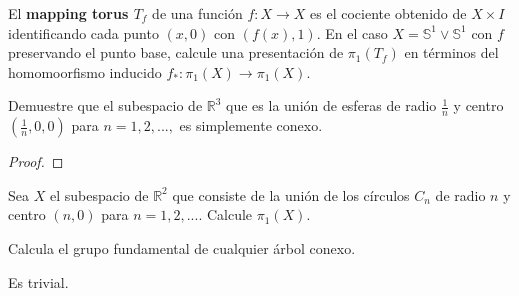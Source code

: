 \documentclass[12pt]{report}
\theoremstyle{largebreak}
\newcommand\cf[3]{\ensuremath{#1:#2\rightarrow#3}}
\begin{document}
    \begin{excer}
        El \textbf{mapping torus $T_f$} de una función $\cf{f}{X}{X}$ es el cociente obtenido de $X\times I$ identificando cada punto $(x,0)$ con $(f(x),1)$. En el caso $X=\mathbb{S}^1\lor\mathbb{S}^1$ con $f$ preservando el punto base, calcule una presentación de $\pi_1(T_f)$ en términos del homomoorfismo inducido $\cf{f_*}{\pi_1(X)}{\pi_1(X)}$.
    \end{excer}

    \begin{sol}
        
    \end{sol}

    \begin{excer}
        Demuestre que el subespacio de $\mathbb{R}^3$ que es la unión de esferas de radio $\frac{1}{n}$ y centro $\left(\frac{1}{n},0,0\right)$ para $n=1,2,...,$ es simplemente conexo.
    \end{excer}

    \begin{proof}
        
    \end{proof}

    \begin{excer}
        Sea $X$ el subespacio de $\mathbb{R}^2$ que consiste de la unión de los círculos $C_n$ de radio $n$ y centro $(n,0)$ para $n=1,2,...$. Calcule $\pi_1(X)$.
    \end{excer}

    \begin{sol}
        
    \end{sol}

    \begin{excer}
        Calcula el grupo fundamental de cualquier árbol conexo.
    \end{excer}

    \begin{sol}
        Es trivial.
    \end{sol}
\end{document}
